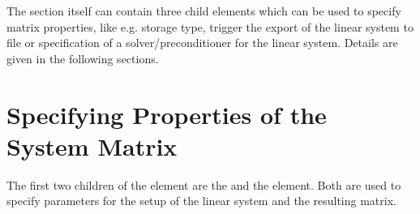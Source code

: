 The  section itself can contain three child elements which can
be
used to specify matrix properties, like e.g. storage type, trigger the export
of the linear system to file or specification of a solver/preconditioner for
the linear system. Details are given in the following sections.
%
%
\section{Specifying Properties of the System Matrix}
%
%
The first two children of the  element are the
 and
the  element. Both are used to specify parameters for the
setup
of the linear system and the resulting matrix.

